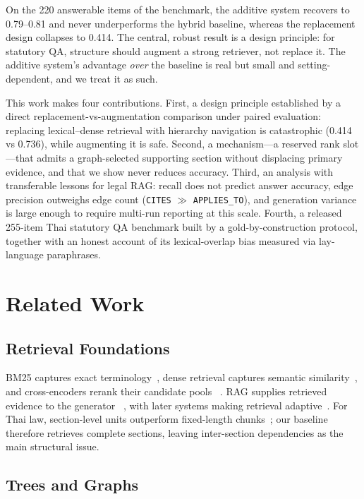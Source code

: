 \documentclass[conference]{IEEEtran}
\begin{document}
On the 220 answerable items of the benchmark, the additive system recovers to 0.79--0.81 and never
underperforms the hybrid baseline, whereas the replacement design collapses to 0.414. The central,
robust result is a design principle: for statutory QA, structure should augment a strong retriever,
not replace it. The additive system's advantage \emph{over} the baseline is real but small and
setting-dependent, and we treat it as such.

This work makes four contributions. First, a design principle established by a direct
replacement-vs-augmentation comparison under paired evaluation: replacing lexical--dense retrieval
with hierarchy navigation is catastrophic (0.414 vs 0.736), while augmenting it is safe. Second, a
mechanism---a reserved rank slot---that admits a graph-selected supporting section without displacing
primary evidence, and that we show never reduces accuracy. Third, an analysis with transferable
lessons for legal RAG: recall does not predict answer accuracy, edge precision outweighs edge count
(\texttt{CITES} $\gg$ \texttt{APPLIES\_TO}), and generation variance is large enough to require
multi-run reporting at this scale. Fourth, a released 255-item Thai statutory QA benchmark built by a
gold-by-construction protocol, together with an honest account of its lexical-overlap bias measured
via lay-language paraphrases.

\section{Related Work}

\subsection{Retrieval Foundations}

BM25 captures exact terminology~\cite{robertson2009bm25}, dense retrieval captures semantic
similarity~\cite{karpukhin2020dpr}, and cross-encoders rerank their candidate pools
~\cite{nogueira2019bertrank}. RAG supplies retrieved evidence to the generator
~\cite{lewis2020rag}, with later systems making retrieval adaptive~\cite{asai2024selfrag}. For Thai
law, section-level units outperform fixed-length chunks~\cite{akarajaradwong2025nitibench}; our
baseline therefore retrieves complete sections, leaving inter-section dependencies as the main
structural issue.

\subsection{Trees and Graphs}
\end{document}
